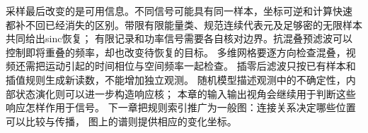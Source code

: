 采样最后改变的是可用信息。不同信号可能具有同一样本，坐标可逆和计算快速
都补不回已经消失的区别。带限有限能量类、规范连续代表元及足够密的无限样本共同给出sinc恢复；
有限记录和功率信号需要各自核对边界。抗混叠预滤波可以控制即将重叠的频率，却也改变待恢复的目标。
多维网格要逐方向检查混叠，视频还需把运动引起的时间相位与空间频率一起检查。
插零后滤波只按已有样本和插值规则生成新读数，不能增加独立观测。
随机模型描述观测中的不确定性，内部状态演化则可以进一步构造响应核；
本章的输入输出视角会继续用于判断这些响应怎样作用于信号。
下一章把规则索引推广为一般图：连接关系决定哪些位置可以比较与传播，
图上的谱则提供相应的变化坐标。

